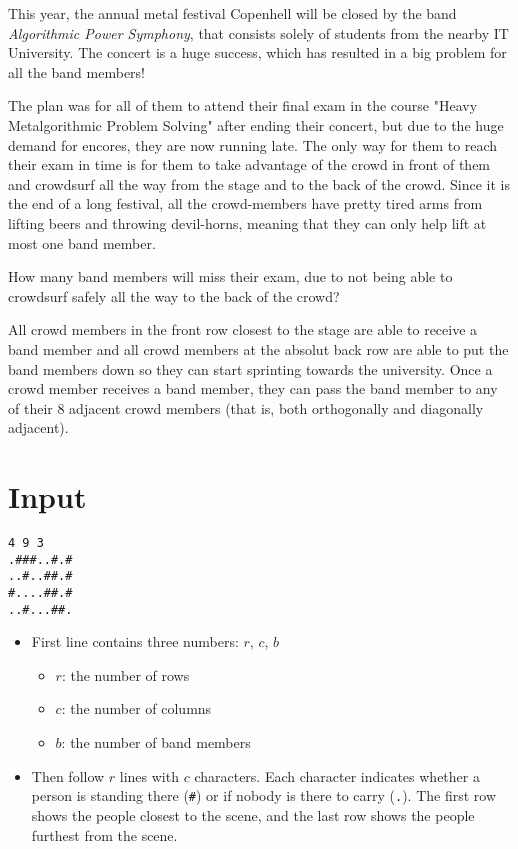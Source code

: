 

This year, the annual metal festival Copenhell will be closed by the band \textit{Algorithmic Power Symphony}, that consists solely of students from the nearby IT University. The concert is a huge success, which has resulted in a big problem for all the band members!

The plan was for all of them to attend their final exam in the course "Heavy Metalgorithmic Problem Solving" after ending their concert, but due to the huge demand for encores, they are now running late. The only way for them to reach their exam in time is for them to take advantage of the crowd in front of them and crowdsurf all the way from the stage and to the back of the crowd. Since it is the end of a long festival, all the crowd-members have pretty tired arms from lifting beers and throwing devil-horns, meaning that they can only help lift at most one band member.

How many band members will miss their exam, due to not being able to crowdsurf safely all the way to the back of the crowd?

All crowd members in the front row closest to the stage are able to receive a band member and all crowd members at the absolut back row are able to put the band members down so they can start sprinting towards the university.
Once a crowd member receives a band member, they can pass the band member to any of their 8 adjacent crowd members (that is, both orthogonally and diagonally adjacent).

\section*{Input}

\begin{verbatim}
4 9 3
.###..#.#
..#..##.#
#....##.#
..#...##.
\end{verbatim}

\begin{itemize}
  \item First line contains three numbers: $r$, $c$, $b$
    \begin{itemize}
      \item $r$: the number of rows
      \item $c$: the number of columns
      \item $b$: the number of band members
    \end{itemize}
  \item Then follow $r$ lines with $c$ characters. Each character indicates whether a person is standing there (\texttt{\#}) or if nobody is there to carry (\texttt{.}). The first row shows the people closest to the scene, and the last row shows the people furthest from the scene.
\end{itemize}

